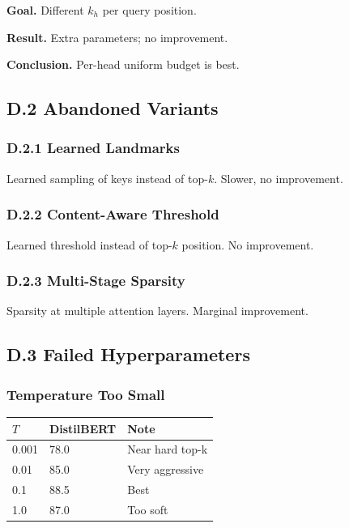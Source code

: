 \textbf{Goal.} Different $k_h$ per query position.

\textbf{Result.} Extra parameters; no improvement.

\textbf{Conclusion.} Per-head uniform budget is best.

\subsection{D.2 Abandoned Variants}

\subsubsection{D.2.1 Learned Landmarks}

Learned sampling of keys instead of top-$k$. Slower, no improvement.

\subsubsection{D.2.2 Content-Aware Threshold}

Learned threshold instead of top-$k$ position. No improvement.

\subsubsection{D.2.3 Multi-Stage Sparsity}

Sparsity at multiple attention layers. Marginal improvement.

\subsection{D.3 Failed Hyperparameters}

\subsubsection{Temperature Too Small}
\begin{table}[H]
\centering
\small
\begin{tabular}{lll}
\toprule
\textbf{$T$} & \textbf{DistilBERT} & \textbf{Note} \\
\midrule
0.001 & 78.0 & Near hard top-k \\
0.01 & 85.0 & Very aggressive \\
0.1 & 88.5 & Best \\
1.0 & 87.0 & Too soft \\
\bottomrule
\end{tabular}
\end{table}

